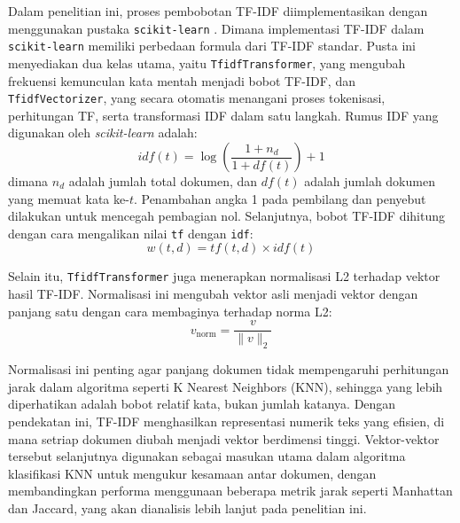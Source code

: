 \documentclass[a4paper,12pt]{report}
\numberwithin{equation}{chapter}
\begin{document}
Dalam penelitian ini, proses pembobotan TF-IDF diimplementasikan dengan menggunakan pustaka \texttt{scikit-learn} \citep{raschka2022ml}. Dimana implementasi TF-IDF dalam \texttt{scikit-learn} memiliki perbedaan formula dari TF-IDF standar. Pusta ini menyediakan dua kelas utama, yaitu \texttt{TfidfTransformer}, yang mengubah frekuensi kemunculan kata mentah menjadi bobot TF-IDF, dan \texttt{TfidfVectorizer}, yang secara otomatis menangani proses tokenisasi, perhitungan TF, serta transformasi IDF dalam satu langkah. Rumus IDF yang digunakan oleh \textit{scikit-learn} adalah:
\begin{equation}
    idf(t)= \log\left(\frac{1+n_d}{1+df(t)}\right) + 1
    \label{eq:IDF2}
\end{equation}
dimana $n_d$ adalah jumlah total dokumen, dan $df(t)$ adalah jumlah dokumen yang memuat kata ke-$t$. Penambahan angka 1 pada pembilang dan penyebut dilakukan untuk mencegah pembagian nol. Selanjutnya, bobot TF-IDF dihitung dengan cara mengalikan nilai \texttt{tf} dengan \texttt{idf}:
\begin{equation}
    w(t,d)=tf(t,d) \times idf(t)
     \label{eq:TFIDF2}
\end{equation}

Selain itu, \texttt{TfidfTransformer} juga menerapkan normalisasi L2 terhadap vektor hasil TF-IDF. Normalisasi ini mengubah vektor asli menjadi vektor dengan panjang satu dengan cara membaginya terhadap norma L2:
\begin{equation}
    {v}_{\text{norm}} = \frac{{v}}{\|{v}\|_2}
     \label{eq:L2}
\end{equation}

Normalisasi ini penting agar panjang dokumen tidak mempengaruhi perhitungan jarak dalam algoritma seperti K Nearest Neighbors (KNN), sehingga yang lebih diperhatikan adalah bobot relatif kata, bukan jumlah katanya. Dengan pendekatan ini, TF-IDF menghasilkan representasi numerik teks yang efisien, di mana setriap dokumen diubah menjadi vektor berdimensi tinggi. Vektor-vektor tersebut selanjutnya digunakan sebagai masukan utama dalam algoritma klasifikasi KNN untuk mengukur kesamaan antar dokumen, dengan membandingkan performa menggunaan beberapa metrik jarak seperti Manhattan dan Jaccard, yang akan dianalisis lebih lanjut pada penelitian ini.
\end{document}

